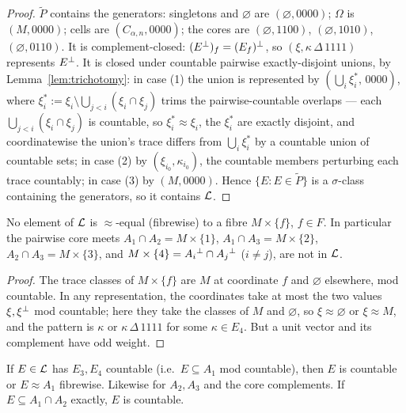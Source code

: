 \begin{proof}
$\widetilde P$ contains the generators: singletons and $\varnothing$ are
$(\varnothing,0000)$; $\Omega$ is $(M,0000)$; cells are $(C_{\alpha,n},0000)$;
the cores are $(\varnothing,1100)$, $(\varnothing,1010)$, $(\varnothing,0110)$.
It is complement-closed: $(E{}^{\perp})_f=(E_f){}^{\perp}$, so $(\xi,\kappa\,\Delta\,1111)$
represents $E{}^{\perp}$. It is closed under countable pairwise exactly-disjoint
unions, by Lemma~\ref{lem:trichotomy}: in case (1) the union is represented by
$(\bigcup_i\xi_i^\ast,\,0000)$, where
$\xi_i^\ast := \xi_i\setminus\bigcup_{j<i}(\xi_i\cap\xi_j)$ trims the
pairwise-countable overlaps --- each $\bigcup_{j<i}(\xi_i\cap\xi_j)$ is countable,
so $\xi_i^\ast\approx\xi_i$, the $\xi_i^\ast$ are exactly disjoint, and
coordinatewise the union's trace differs from $\bigcup_i\xi_i^\ast$ by a
countable union of countable sets; in case (2) by $(\xi_{i_0},\kappa_{i_0})$,
the countable members perturbing each trace countably; in case (3) by
$(M,0000)$. Hence $\{E : E\in\widetilde P\}$ is a $\sigma$-class containing the
generators, so it contains $\mathcal{L}$.
\end{proof}

\begin{corollary}\label{cor:meet-region}
No element of $\mathcal{L}$ is $\approx$-equal (fibrewise) to a fibre $M\times\{f\}$,
$f\in F$. In particular the pairwise core meets $A_1\cap A_2=M\times\{1\}$,
$A_1\cap A_3=M\times\{2\}$, $A_2\cap A_3=M\times\{3\}$, and
$M\times\{4\}=A_i{}^{\perp}\cap A_j{}^{\perp}$ ($i\neq j$), are not in $\mathcal{L}$.
\end{corollary}

\begin{proof}
The trace classes of $M\times\{f\}$ are $M$ at coordinate $f$ and $\varnothing$
elsewhere, mod countable. In any representation, the coordinates take at most the two
values $\xi,\xi{}^{\perp}$ mod countable; here they take the classes of $M$ and
$\varnothing$, so $\xi\approx\varnothing$ or $\xi\approx M$, and the pattern is
$\kappa$ or $\kappa\,\Delta\,1111$ for some $\kappa\in E_4$. But a unit vector
and its complement have odd weight.
\end{proof}

\begin{corollary}\label{cor:stripping}
If $E\in\mathcal{L}$ has $E_3,E_4$ countable (i.e.\ $E\subseteq A_1$ mod countable),
then $E$ is countable or $E\approx A_1$ fibrewise. Likewise for $A_2,A_3$ and
the core complements. If $E\subseteq A_1\cap A_2$ exactly, $E$ is countable.
\end{corollary}

